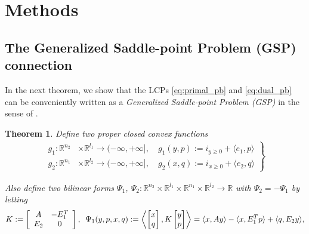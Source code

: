 \documentclass{article} %
\newtheorem{theorem}{Theorem} \newtheorem{lemma}[theorem]{Lemma}
\begin{document}
\section{Methods}
\label{sec:gsp}
\subsection{The Generalized Saddle-point Problem (GSP) connection}
In the next theorem, we show that the LCPs \eqref{eq:primal_pb}
and \eqref{eq:dual_pb} can be
conveniently written as a \textit{Generalized Saddle-point Problem
  (GSP)} in the sense of \cite{he2013accelerating}.
\begin{theorem}
Define two proper closed convex functions
  \begin{eqnarray}
    \left.
    \begin{aligned}
      g_1: \mathbb{R}^{n_2} &\times \mathbb{R}^{l_1} \rightarrow
      (-\infty, +\infty], \hspace{1em} g_1(y, p) :=
        i_{y \ge 0} + \langle e_1,p\rangle\\
        g_2: \mathbb{R}^{n_1} &\times \mathbb{R}^{l_2} \rightarrow
        (-\infty, +\infty],\hspace{1em} g_2(x, q) :=
          i_{x \ge 0} + \langle e_2, q\rangle
    \end{aligned}
    \right\}
    \label{eq:things}
  \end{eqnarray}

Also define two bilinear forms $\Psi_1$, $\Psi_2: \mathbb{R}^{n_2}
\times \mathbb{R}^{l_1} \times \mathbb{R}^{n_1} \times
\mathbb{R}^{l_2} \rightarrow \mathbb{R}$ with $\Psi_2 = -\Psi_1$ by letting
  \begin{equation}
      K :=
      \left[
        \begin{array}{cc}
          A & -E_1^T \\
          E_2 & 0
        \end{array}
        \right],\hspace{.5em}
    \Psi_1(y, p, x, q)
    := \left\langle \begin{bmatrix}x\\q\end{bmatrix},
      K\begin{bmatrix}y\\p\end{bmatrix}\right\rangle = \langle x,
      Ay\rangle -\langle x, E_1^Tp\rangle + \langle q, E_2y\rangle,
\end{equation}


\end{theorem}
\end{document}
